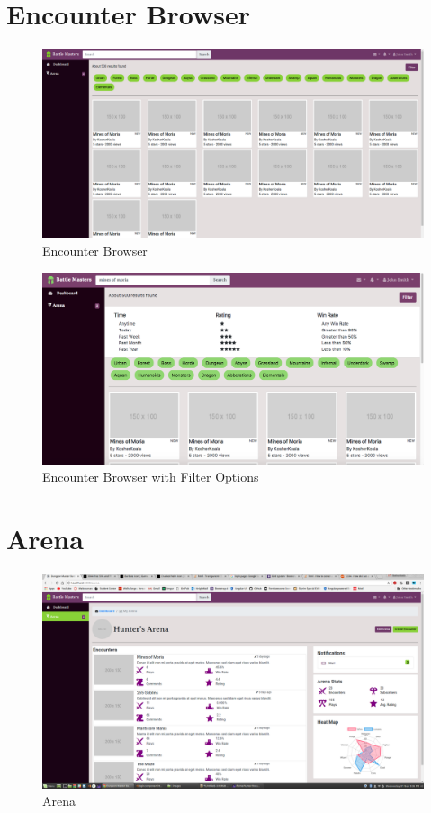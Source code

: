 \documentclass[12pt,a4paper]{report}
\begin{document}
	\section{Encounter Browser}
	\begin{figure}[H]
		\centering
		\includegraphics[scale=.19]{search}
		\caption{Encounter Browser}
		\label{fig: Encounter Browser}
	\end{figure}

	\begin{figure}[H]
		\centering
		\includegraphics[scale=.25]{search_filtered}
		\caption{Encounter Browser with Filter Options}
		\label{fig: Encounter Browser with Filter Options}	
	\end{figure}
	\newpage
	\section{Arena}
	\begin{figure}[H]
		\centering
		\includegraphics[scale=.20]{arena}
		\caption{Arena}
		\label{fig: Arena}
	\end{figure}
\end{document}
